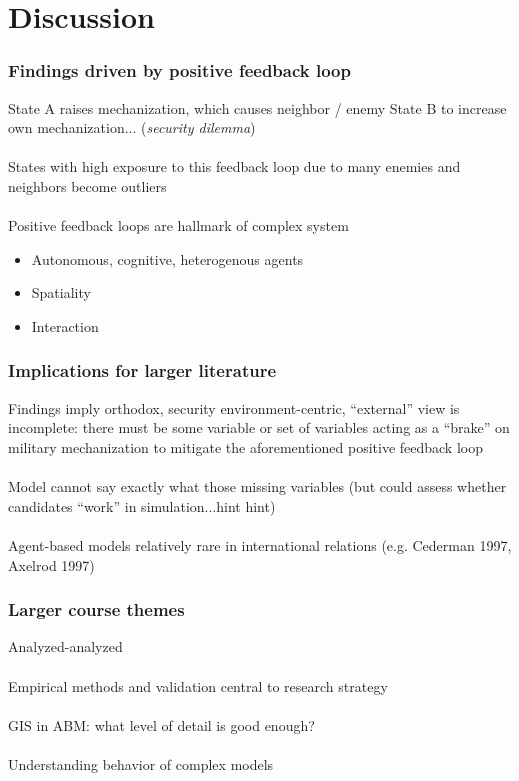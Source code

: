 \documentclass{beamer}
\begin{document}
\section{Discussion}

\begin{frame}
	\frametitle{Findings driven by positive feedback loop}

	State A raises mechanization, which causes neighbor / enemy State B to
	increase own mechanization... (\textit{security dilemma})\\~\\

	States with high exposure to this feedback loop due to many enemies and
	neighbors become outliers \\~\\

	Positive feedback loops are hallmark of complex system
	\begin{itemize}
		\item \small Autonomous, cognitive, heterogenous agents
		\item \small Spatiality
		\item \small Interaction
	\end{itemize}
\end{frame}

\begin{frame}
	\frametitle{Implications for larger literature}
	Findings imply orthodox, security environment-centric, ``external'' view
	is incomplete: there must be some variable or set of variables acting as
	a ``brake'' on military mechanization to mitigate the aforementioned
	positive feedback loop \\~\\

	Model cannot say exactly what those missing variables (but could assess
	whether candidates ``work'' in simulation...hint hint) \\~\\

	Agent-based models relatively rare in international relations (e.g.
	Cederman 1997, Axelrod 1997)
\end{frame}
\begin{frame}
	\frametitle{Larger course themes}
	
	Analyzed-analyzed\\~\\
	
	Empirical methods and validation central to research strategy \\~\\

	GIS in ABM: what level of detail is good enough? \\~\\

	Understanding behavior of complex models \\~\\

\end{frame}
\end{document}

